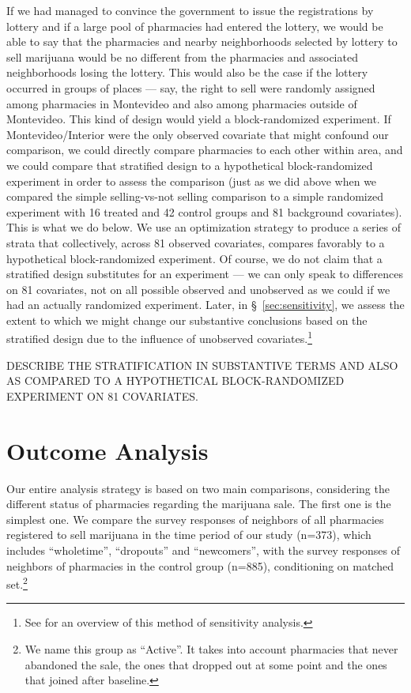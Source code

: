 \documentclass[11pt]{article}
\begin{document}
If we had managed to convince the government to issue the registrations by lottery and if a large pool of pharmacies had entered the lottery, we would be able to say that the pharmacies and nearby neighborhoods selected by lottery to sell marijuana would be no different from the pharmacies and associated neighborhoods losing the lottery. This would also be the case if the lottery occurred in groups of places --- say, the right to sell were randomly assigned among pharmacies in Montevideo and also among pharmacies outside of Montevideo. This kind of design would yield a block-randomized experiment. If Montevideo/Interior were the only observed covariate that might confound our comparison, we could directly compare pharmacies to each other within area, and we could compare that stratified design to a hypothetical block-randomized experiment in order to assess the comparison (just as we did above when we compared the simple selling-vs-not selling comparison to a simple randomized experiment with 16 treated and 42 control groups and 81 background covariates). This is what we do below. We use an optimization strategy to produce a series of strata that collectively, across 81 observed covariates, compares favorably to a hypothetical block-randomized experiment. Of course, we do not claim that a stratified design substitutes for an experiment --- we can only speak to differences on 81 covariates, not on all possible observed and unobserved as we could if we had an actually randomized experiment. Later, in \S~\ref{sec:sensitivity}, we assess the extent to which we might change our substantive conclusions based on the stratified design due to the influence of unobserved covariates.\footnote{See \citep[Chapter 3]{rosenbaum2010design} for an overview of this method of sensitivity analysis.}


DESCRIBE THE STRATIFICATION IN SUBSTANTIVE TERMS AND ALSO AS COMPARED TO A HYPOTHETICAL BLOCK-RANDOMIZED EXPERIMENT ON 81 COVARIATES.


\section{Outcome Analysis}
Our entire analysis strategy is based on two main comparisons, considering the different status of pharmacies regarding the marijuana sale. The first one is the simplest one. We compare the survey responses of neighbors of all pharmacies registered to sell marijuana in the time period of our study (n=373), which includes ``wholetime'', ``dropouts'' and ``newcomers'', with the survey responses of neighbors of pharmacies in the control group (n=885), conditioning on matched set.\footnote{We name this group as ``Active''. It takes into account pharmacies that never abandoned the sale, the ones that dropped out at some point and the ones that joined after baseline.}
\end{document}
